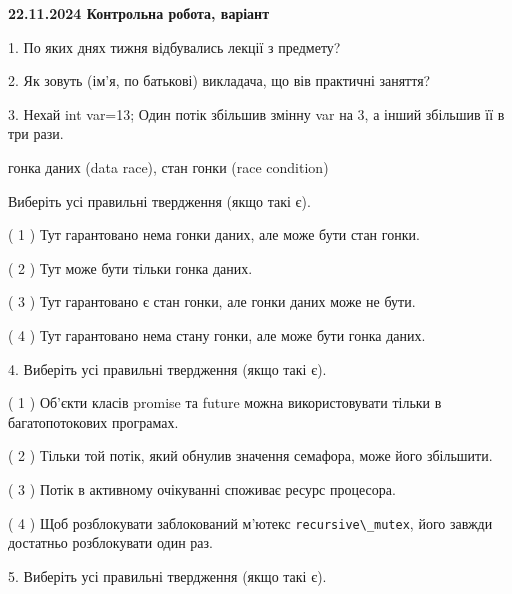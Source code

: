 \documentclass[12pt, ukrainian]{article}
\def\code#1{\Verb!#1!}
\begin{document}
\vspace{4mm}
\newpage
\begin {large}

\textbf{22.11.2024 Контрольна робота, варіант  }\par


{
1. По яких днях тижня відбувались лекції з предмету?



\vspace{5mm}
2. Як зовуть (ім'я, по батькові) викладача, що вів практичні заняття?



\vspace{5mm}
3. Нехай int var=13; Один потік збільшив змінну var на 3, а інший збільшив її в три рази.

гонка даних (data race), стан гонки (race condition)

Виберіть усі правильні твердження (якщо такі є).\par
\vspace{2mm}
( 1 ) Тут гарантовано нема гонки даних, але може бути стан гонки.%

( 2 ) Тут може бути тільки гонка даних.%

( 3 ) Тут гарантовано є стан гонки, але гонки даних може не бути.%

( 4 ) Тут гарантовано нема стану гонки, але може бути гонка даних.%


\vspace{5mm}
4. Виберіть усі правильні твердження (якщо такі є).\par
\vspace{2mm}

( 1 ) Об’єкти класів promise та future можна використовувати тільки в багатопотокових програмах.%

( 2 ) Тільки той потік, який обнулив значення семафора, може його збільшити.%

( 3 ) Потік в активному очікуванні споживає ресурс процесора.%

( 4 ) Щоб розблокувати заблокований м’ютекс \code{recursive\_mutex}, його завжди достатньо розблокувати один раз.%


\vspace{5mm}
5. Виберіть усі правильні твердження (якщо такі є).\par
\vspace{2mm}

}
\end{large}
\end{document}
